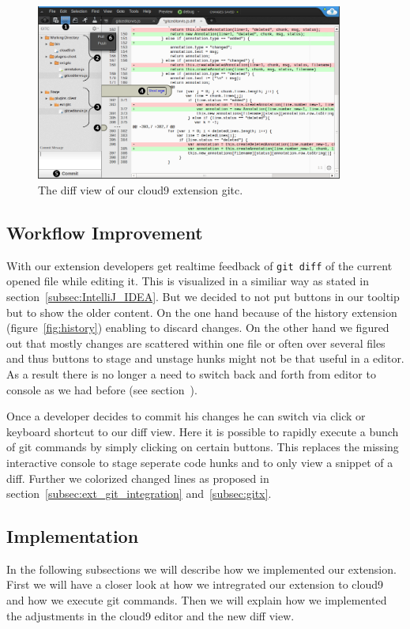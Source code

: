 \begin{figure}
   \centering
   \includegraphics[width=0.9\textwidth]{images/extension_unstage.png}
   \caption{The diff view of our cloud9 extension gitc.}
   \label{fig:diff_view}
\end{figure}

\subsection{Workflow Improvement}
With our extension developers get realtime feedback of \texttt{git diff} of the current opened file while editing it.
This is visualized in a similiar way as stated in section~\ref{subsec:IntelliJ_IDEA}.
But we decided to not put buttons in our tooltip but to show the older content.
On the one hand because of the history extension (figure~\ref{fig:history}) enabling to discard changes.
On the other hand we figured out that mostly changes are scattered within one file or often over several files and thus buttons to stage and unstage hunks might not be that useful in a editor.
As a result there is no longer a need to switch back and forth from editor to console as we had before (see section~).

Once a developer decides to commit his changes he can switch via click or keyboard shortcut to our diff view.
Here it is possible to rapidly execute a bunch of git commands by simply clicking on certain buttons.
This replaces the missing interactive console to stage seperate code hunks and to only view a snippet of a diff.
Further we colorized changed lines as proposed in section~\ref{subsec:ext_git_integration} and~\ref{subsec:gitx}.


\subsection{Implementation}
In the following subsections we will describe how we implemented our extension.
First we will have a closer look at how we intregrated our extension to cloud9 and how we execute git commands.
Then we will explain how we implemented the adjustments in the cloud9 editor and the new diff view.


